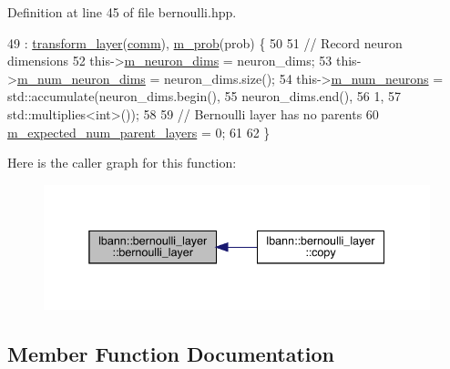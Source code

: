 Definition at line 45 of file bernoulli.\+hpp.


\begin{DoxyCode}
49     : \hyperlink{classlbann_1_1transform__layer_a4b72501e0f4d0745c8b13c5331055e65}{transform\_layer}(\hyperlink{file__io_8cpp_ab048c6f9fcbcfaa57ce68b00263dbebe}{comm}), \hyperlink{classlbann_1_1bernoulli__layer_a4f4b68b455233b5e4c5c6f992289669c}{m\_prob}(prob) \{
50 
51     \textcolor{comment}{// Record neuron dimensions}
52     this->\hyperlink{classlbann_1_1Layer_abb34bb8031f57a483e2e327a5f229f48}{m\_neuron\_dims} = neuron\_dims;
53     this->\hyperlink{classlbann_1_1Layer_adfd6178d21498c9095cd947ae1eb2d6a}{m\_num\_neuron\_dims} = neuron\_dims.size();
54     this->\hyperlink{classlbann_1_1Layer_a6b5ebc8a7d9329d8a773ed787e7b41d8}{m\_num\_neurons} = std::accumulate(neuron\_dims.begin(),
55                                           neuron\_dims.end(),
56                                           1,
57                                           std::multiplies<int>());
58 
59     \textcolor{comment}{// Bernoulli layer has no parents}
60     \hyperlink{classlbann_1_1Layer_a841b96b25555247f52921c7f13ae1dfa}{m\_expected\_num\_parent\_layers} = 0;
61 
62   \}
\end{DoxyCode}
Here is the caller graph for this function\+:\nopagebreak
\begin{figure}[H]
\begin{center}
\leavevmode
\includegraphics[width=338pt]{classlbann_1_1bernoulli__layer_a59ea36ca262436f918f06cf3ea43d999_icgraph}
\end{center}
\end{figure}


\subsection{Member Function Documentation}
\mbox{\label{classlbann_1_1bernoulli__layer_ae7e19bd34b17e1503755ac6e6b1260aa}} 
